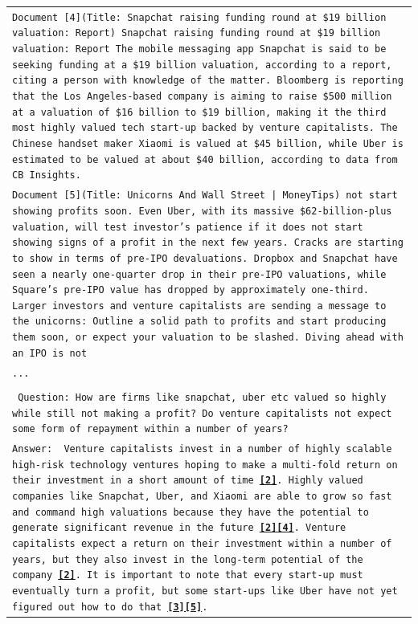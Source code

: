 \documentclass[11pt]{article}
\newcommand\tf[1]{\textbf{#1}}
\begin{document}
\begin{table}[h]
\begin{tabular}{>{\raggedright\arraybackslash\tt}p{}<{}}
            Document [4](Title: Snapchat raising funding round at \$19 billion valuation: Report) Snapchat raising funding round at \$19 billion valuation: Report The mobile messaging app Snapchat is said to be seeking funding at a \$19 billion valuation, according to a report, citing a person with knowledge of the matter. Bloomberg is reporting that the Los Angeles-based company is aiming to raise \$500 million at a valuation of \$16 billion to \$19 billion, making it the third most highly valued tech start-up backed by venture capitalists. The Chinese handset maker Xiaomi is valued at \$45 billion, while Uber is estimated to be valued at about \$40 billion, according to data from CB Insights. \\
            Document [5](Title: Unicorns And Wall Street | MoneyTips) not start showing profits soon. Even Uber, with its massive \$62-billion-plus valuation, will test investor's patience if it does not start showing signs of a profit in the next few years. Cracks are starting to show in terms of pre-IPO devaluations. Dropbox and Snapchat have seen a nearly one-quarter drop in their pre-IPO valuations, while Square's pre-IPO value has dropped by approximately one-third. Larger investors and venture capitalists are sending a message to the unicorns: Outline a solid path to profits and start producing them soon, or expect your valuation to be slashed. Diving ahead with an IPO is not \\
            ... \\
            \\
            \vspace{-1em}
            Question: How are firms like snapchat, uber etc valued so highly while still not making a profit? Do venture capitalists not expect some form of repayment within a number of years? \\
            Answer: {\color{blue} Venture capitalists invest in a number of highly scalable high-risk technology ventures hoping to make a multi-fold return on their investment in a short amount of time \tf{\underline{[2]}}. Highly valued companies like Snapchat, Uber, and Xiaomi are able to grow so fast and command high valuations because they have the potential to generate significant revenue in the future \tf{\underline{[2][4]}}. Venture capitalists expect a return on their investment within a number of years, but they also invest in the long-term potential of the company \tf{\underline{[2]}}. It is important to note that every start-up must eventually turn a profit, but some start-ups like Uber have not yet figured out how to do that \tf{\underline{[3][5]}}.}\\

\end{tabular}
\end{table}
\end{document}
